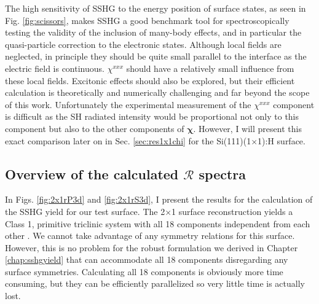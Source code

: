 The high sensitivity of SSHG to the energy position of surface states, as seen
in Fig. \ref{fig:scissors}, makes SSHG a good benchmark tool for
spectroscopically testing the validity of the inclusion of many-body effects,
and in particular the quasi-particle correction to the electronic states.
Although local fields are neglected, in principle they should be quite small
parallel to the interface as the electric field is continuous. $\chi^{xxx}$
should have a relatively small influence from these local fields. Excitonic
effects should also be explored, but their efficient calculation is
theoretically and numerically challenging \cite{beyond} and far beyond the scope
of this work. Unfortunately the experimental measurement of the $\chi^{xxx}$
component is difficult as the SH radiated intensity would be proportional not
only to this component but also to the other components of $\boldsymbol{\chi}$.
However, I will present this exact comparison later on in Sec.
\ref{sec:res1x1chi} for the Si(111)(1$\times$1):H surface.



\subsection{Overview of the calculated \texorpdfstring{$\mathcal{R}$}{R}
spectra}\label{sec:2x1R3D}

In Figs. \ref{fig:2x1rP3d} and \ref{fig:2x1rS3d}, I present the results for the
calculation of the SSHG yield for our test surface. The 2$\times$1 surface
reconstruction yields a Class 1, primitive triclinic system with all 18
components independent from each other \cite{popovbook}. We cannot take
advantage of any symmetry relations for this surface. However, this is no
problem for the robust formulation we derived in Chapter \ref{chap:sshgyield}
that can accommodate all 18 components disregarding any surface symmetries.
Calculating all 18 components is obviously more time consuming, but they can be
efficiently parallelized so very little time is actually lost.


